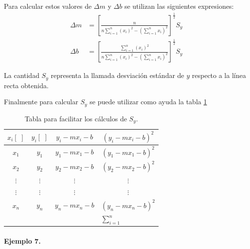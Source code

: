 Para calcular estos valores de $\Delta m$ y $\Delta b$ se utilizan las siguientes expresiones:
\begin{eqnarray}
\Delta m & =\left[\frac{n}{n \sum\limits_{i=1}^n\left(x_i\right)^2-\left(\sum\limits_{i=1}^n x_i\right)^2}\right]^{\frac{1}{2}} S_y 
\label{Delm}\\
\Delta b & =\left[\frac{\sum\limits_{i=1}^n\left(x_i\right)^2}{n \sum\limits_{i=1}^n\left(x_i\right)^2-\left(\sum\limits_{i=1}^n x_i\right)^2}\right]^{\frac{1}{2}} S_y
\label{Delb}
\end{eqnarray}

La cantidad $S_y$ representa la llamada desviaci\'on est\'andar de $y$ respecto a la l\'inea recta obtenida.

Finalmente para calcular $S_y$ se puede utilizar como ayuda la tabla \ref{tablamincua2}
\begin{table}[h]
\begin{center}
\begin{tabular}{|c|c|c|c|}
\hline$x_i [\,\,]$ & $y_i [\,\,]$ & $y_i-m x_i-b$ & $(y_i-m x_i-b)^2$ \\
\hline \hline$x_1$ & $y_1$ & $y_1-m x_1-b$ & $\left(y_1-m x_1-b\right)^2$ \\
\hline$x_2$ & $y_2$ & $y_2-m x_2-b$ & $\left(y_2-m x_2-b\right)^2$ \\
\hline$\vdots$ & $\vdots$ & $\vdots$ & $\vdots$ \\
\hline$\vdots$ & $\vdots$ & $\vdots$ & $\vdots$ \\
\hline$x_n$ & $y_n$ & $y_n-m x_n-b$ & $\left(y_n-m x_n-b\right)^2$ \\ \hline
\hline & & & $\sum\limits_{i=1}^n \qquad \qquad \quad$ \\
\hline
\end{tabular}
\end{center}
\caption{Tabla para facilitar los c\'alculos de $S_y$.}
\label{tablamincua2}
\end{table}

\paragraph{Ejemplo 7.}

